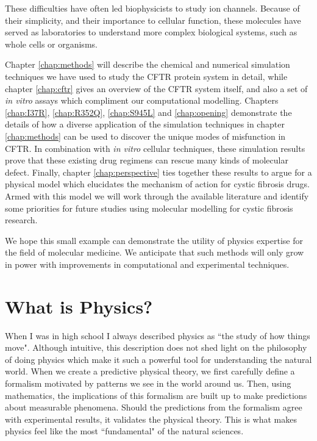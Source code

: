 These difficulties have often led biophysicists to study ion channels. Because of their simplicity, and their importance to cellular function, these molecules have served as laboratories to understand more complex biological systems, such as whole cells or organisms. 

Chapter \ref{chap:methods} will describe the chemical and numerical simulation techniques we have used to study the CFTR protein system in detail, while chapter \ref{chap:cftr} gives an overview of the CFTR system itself, and also a set of \textit {in vitro} assays which compliment our computational modelling.  Chapters \ref{chap:I37R}, \ref{chap:R352Q}, \ref{chap:S945L} and \ref{chap:opening} demonstrate the details of how a diverse application of the simulation techniques in chapter \ref{chap:methods} can be used to discover the unique modes of misfunction in CFTR. In combination with \textit {in vitro} cellular techniques, these simulation results prove that these existing drug regimens can rescue many kinds of molecular defect. Finally, chapter \ref{chap:perspective} ties together these results to argue for a physical model which elucidates the mechanism of action for cystic fibrosis drugs. Armed with this model we will work through the available literature and identify some priorities for future studies using molecular modelling for cystic fibrosis research. 


We hope this small example can demonstrate the utility of physics expertise for the field of molecular medicine. We anticipate that such methods will only grow in power with improvements in computational and experimental techniques.

\section{What is Physics?}
\label{WIP}
When I was in high school I always described physics as ``the study of how things move". Although intuitive, this description does not shed light on the philosophy of doing physics which make it such a powerful tool for understanding the natural world. When we create a predictive physical theory, we first carefully define a formalism motivated by patterns we see in the world around us. Then, using mathematics, the implications of this formalism are built up to make predictions about measurable phenomena. Should the predictions from the formalism agree with experimental results, it validates the physical theory. This is what makes physics feel like the most ``fundamental" of the natural sciences.

